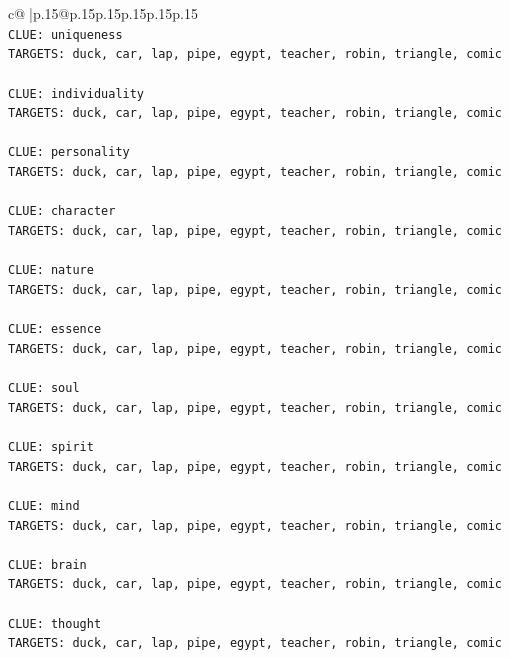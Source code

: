 \documentclass{article}
\begin{document}
{\begin{supertabular}{c@{$\;$}|p{.15\linewidth}@{}p{.15\linewidth}p{.15\linewidth}p{.15\linewidth}p{.15\linewidth}p{.15\linewidth}}
{{{\\ 
\texttt{CLUE: uniqueness} \\
\texttt{TARGETS: duck, car, lap, pipe, egypt, teacher, robin, triangle, comic} \\
\\ 
\texttt{CLUE: individuality} \\
\texttt{TARGETS: duck, car, lap, pipe, egypt, teacher, robin, triangle, comic} \\
\\ 
\texttt{CLUE: personality} \\
\texttt{TARGETS: duck, car, lap, pipe, egypt, teacher, robin, triangle, comic} \\
\\ 
\texttt{CLUE: character} \\
\texttt{TARGETS: duck, car, lap, pipe, egypt, teacher, robin, triangle, comic} \\
\\ 
\texttt{CLUE: nature} \\
\texttt{TARGETS: duck, car, lap, pipe, egypt, teacher, robin, triangle, comic} \\
\\ 
\texttt{CLUE: essence} \\
\texttt{TARGETS: duck, car, lap, pipe, egypt, teacher, robin, triangle, comic} \\
\\ 
\texttt{CLUE: soul} \\
\texttt{TARGETS: duck, car, lap, pipe, egypt, teacher, robin, triangle, comic} \\
\\ 
\texttt{CLUE: spirit} \\
\texttt{TARGETS: duck, car, lap, pipe, egypt, teacher, robin, triangle, comic} \\
\\ 
\texttt{CLUE: mind} \\
\texttt{TARGETS: duck, car, lap, pipe, egypt, teacher, robin, triangle, comic} \\
\\ 
\texttt{CLUE: brain} \\
\texttt{TARGETS: duck, car, lap, pipe, egypt, teacher, robin, triangle, comic} \\
\\ 
\texttt{CLUE: thought} \\
\texttt{TARGETS: duck, car, lap, pipe, egypt, teacher, robin, triangle, comic} \\
\\ 
}}}
\end{supertabular}}
\end{document}

